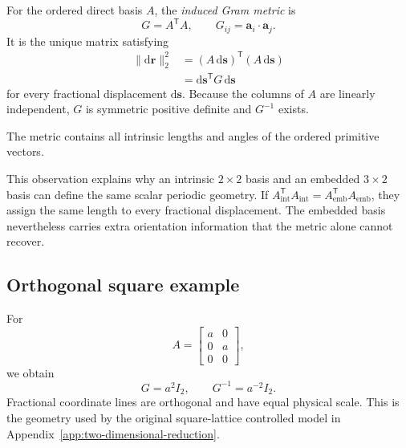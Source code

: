 \begin{definition}
\label{def:training-induced-gram-metric}
For the ordered direct basis $A$, the \emph{induced Gram metric} is
\begin{equation}
  G=A^{\mathsf T}A,
  \qquad
  G_{ij}=\mathbf a_i\cdot\mathbf a_j.
  \label{eq:training-gram-metric}
\end{equation}
It is the unique matrix satisfying
\begin{align}
  \lVert \mathrm{d}\mathbf r\rVert_2^2
  &= (A\,\mathrm{d}\mathbf s)^{\mathsf T}
     (A\,\mathrm{d}\mathbf s) \\
  &= \mathrm{d}\mathbf s^{\mathsf T}G\,\mathrm{d}\mathbf s
  \label{eq:training-induced-metric}
\end{align}
for every fractional displacement $\mathrm{d}\mathbf s$. Because the columns
of $A$ are linearly independent, $G$ is symmetric positive definite and
$G^{-1}$ exists.
\end{definition}

The metric contains all intrinsic lengths and angles of the ordered primitive
vectors.

This observation explains why an intrinsic $2\times2$ basis and an embedded
$3\times2$ basis can define the same scalar periodic geometry. If
$A_{\mathrm{int}}^{\mathsf T}A_{\mathrm{int}}
=A_{\mathrm{emb}}^{\mathsf T}A_{\mathrm{emb}}$, they assign the same length to
every fractional displacement. The embedded basis nevertheless carries extra
orientation information that the metric alone cannot recover.

\subsection{Orthogonal square example}

For
\begin{equation}
  A=
  \begin{bmatrix}
    a & 0\\
    0 & a\\
    0 & 0
  \end{bmatrix},
  \label{eq:training-square-embedded-basis}
\end{equation}
we obtain
\begin{equation}
  G=a^2I_2,
  \qquad
  G^{-1}=a^{-2}I_2.
  \label{eq:training-square-metric}
\end{equation}
Fractional coordinate lines are orthogonal and have equal physical scale.
This is the geometry used by the original square-lattice controlled model in
Appendix~\ref{app:two-dimensional-reduction}.

